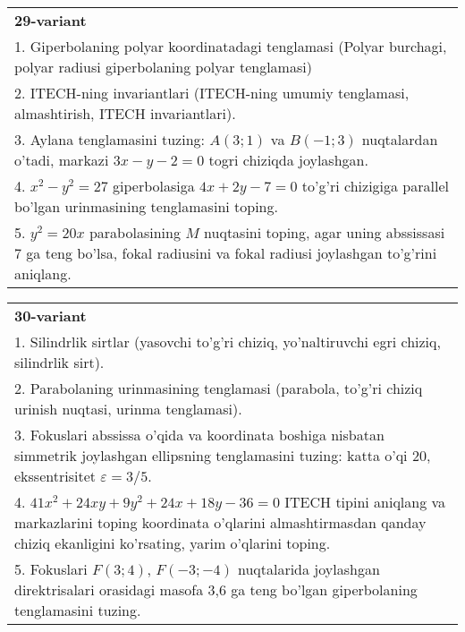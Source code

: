 \documentclass{article}
\begin{document}
\begin{tabular}{m{17cm}}
\textbf{29-variant}\\
1. Giperbolaning polyar koordinatadagi tenglamasi (Polyar burchagi, polyar radiusi giperbolaning polyar tenglamasi)\\

2. ITECH-ning invariantlari (ITECH-ning umumiy tenglamasi, almashtirish, ITECH invariantlari).\\

3. Aylana tenglamasini tuzing: $A(3;1)$ va $B(-1;3)$ nuqtalardan o'tadi, markazi $3x-y-2=0$ togri chiziqda joylashgan.\\

4. $x^{2} - y^{2} = 27$ giperbolasiga $4x + 2y - 7 = 0$ to'g'ri chizigiga parallel bo'lgan urinmasining tenglamasini toping.  \\

5. $y^{2} = 20x$ parabolasining $M$ nuqtasini toping, agar uning abssissasi 7 ga teng bo'lsa, fokal radiusini va fokal radiusi joylashgan to'g'rini aniqlang.
\end{tabular}
\vspace{1cm}


\begin{tabular}{m{17cm}}
\textbf{30-variant}\\
1. Silindrlik sirtlar (yasovchi to'g'ri chiziq, yo'naltiruvchi egri chiziq, silindrlik sirt).\\

2. Parabolaning urinmasining tenglamasi (parabola, to'g'ri chiziq urinish nuqtasi, urinma tenglamasi).\\

3. Fokuslari abssissa o'qida va koordinata boshiga nisbatan simmetrik joylashgan ellipsning tenglamasini tuzing: katta o'qi $20$, ekssentrisitet $\varepsilon=3/5$.\\

4. $41x^{2} + 24xy + 9y^{2} + 24x + 18y - 36 = 0$ ITECH tipini aniqlang va markazlarini toping koordinata o'qlarini almashtirmasdan qanday chiziq ekanligini ko'rsating, yarim o'qlarini toping.  \\

5. Fokuslari $F(3;4)$, $F(-3;-4)$ nuqtalarida joylashgan direktrisalari orasidagi masofa 3,6 ga teng bo'lgan giperbolaning tenglamasini tuzing.  
\end{tabular}
\vspace{1cm}
\end{document}
